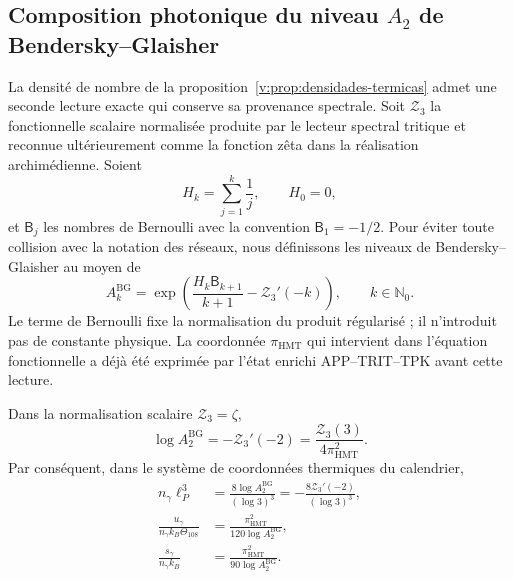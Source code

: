 \subsection{Composition photonique du niveau \texorpdfstring{\(A_2\)}{A2} de Bendersky--Glaisher}
\label{v:subsec:bendersky-fotonica}

La densité de nombre de la proposition~\ref{v:prop:densidades-termicas}
admet une seconde lecture exacte qui conserve sa provenance spectrale.
Soit \(\mathcal Z_3\) la fonctionnelle scalaire normalisée produite par le
lecteur spectral tritique et reconnue ultérieurement comme la fonction zêta
dans la réalisation archimédienne. Soient
\[
 H_k=\sum_{j=1}^{k}\frac1j,\qquad H_0=0,
\]
et \(\mathsf B_j\) les nombres de Bernoulli avec la convention
\(\mathsf B_1=-1/2\). Pour éviter toute collision avec la notation des réseaux,
nous définissons les niveaux de Bendersky--Glaisher au moyen de
\begin{equation}
 A_k^{\mathrm{BG}}
 =\exp\!\left(
   \frac{H_k\mathsf B_{k+1}}{k+1}-\mathcal Z_3'(-k)
 \right),\qquad k\in\mathbb N_0.
 \label{v:eq:bendersky-bg}
\end{equation}
Le terme de Bernoulli fixe la normalisation du produit régularisé ;
il n’introduit pas de constante physique. La coordonnée
\(\pi_{\mathrm{HMT}}\) qui intervient dans l’équation fonctionnelle a déjà été
exprimée par l’état enrichi APP--TRIT--TPK avant cette lecture.

\begin{proposition}
\label{v:prop:bendersky-fotonica}
Dans la normalisation scalaire \(\mathcal Z_3=\zeta\),
\begin{equation}
 \log A_2^{\mathrm{BG}}
 =-\mathcal Z_3'(-2)
 =\frac{\mathcal Z_3(3)}{4\pi_{\mathrm{HMT}}^2}.
 \label{v:eq:bendersky-nivel-dos}
\end{equation}
Par conséquent, dans le système de coordonnées thermiques du calendrier,
\begin{align}
 n_\gamma\ell_P^3
  &=\frac{8\log A_2^{\mathrm{BG}}}{(\log3)^3}
   =-\frac{8\mathcal Z_3'(-2)}{(\log3)^3},
   \label{v:eq:numero-fotones-bendersky}\\
 \frac{u_\gamma}{n_\gamma k_B\Theta_{108}}
  &=\frac{\pi_{\mathrm{HMT}}^2}{120\log A_2^{\mathrm{BG}}},
   \label{v:eq:energia-media-bendersky}\\
 \frac{s_\gamma}{n_\gamma k_B}
  &=\frac{\pi_{\mathrm{HMT}}^2}{90\log A_2^{\mathrm{BG}}}.
   \label{v:eq:entropia-media-bendersky}
\end{align}
\end{proposition}

